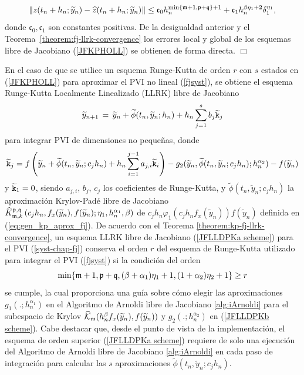 \begin{equation*}
    \left\lVert z(t_n+h_n;\widetilde{y}_n)-\widehat{z}(t_n+h_n;\widetilde{y}_n) \right\rVert \leq \mathfrak{c}_0 h_n^{\min\{\mathfrak{m}+1,\mathfrak{p}+\mathfrak{q} \}+1} + \mathfrak{c}_1h_n^{\beta\eta_1+2}\delta_1^{\eta_1},
\end{equation*}
donde $\mathfrak{c}_0,\mathfrak{c}_1$ son constantes positivas. De la desigualdad anterior y el Teorema~\ref{theorem:fj-llrk-convergence} los errores local y global de los esquemas libre de Jacobiano (\ref{JFKPHOLL}) se obtienen de forma directa. $\Box$

En el caso de que se utilice un esquema Runge-Kutta de orden $r$ con $s$ estados en (\ref{JFKPHOLL}) para aproximar el PVI no lineal (\ref{fjsyst}), se obtiene el esquema Runge-Kutta Localmente Linealizado (LLRK) libre de Jacobiano
\begin{equation}  \label{JFLLDPKa scheme}
    \widetilde{y}_{n+1}\,=\,\widetilde{y}_n+\widetilde{\phi}(t_n,\widetilde{y}_n;h_n)+h_n \sum_{j=1}^{s}b_j \widetilde{\mathtt{k}}_j
\end{equation}
para integrar PVI de dimensiones no pequeñas, donde
\begin{equation} \label{JFLLDPKb scheme}
    \widetilde{\mathtt{k}}_j = f\left( \widetilde{y}_n+\widetilde{\phi}(t_n,\widetilde{y}_n;c_jh_n)+h_n \sum_{i=1}^{j-1}a_{j,i}\widetilde{\mathtt{k}}_i \right)  - g_2(\widetilde{y}_n,\widetilde{\phi}(t_n,\widetilde{y}_n;c_jh_n);h^{\alpha_2}_n) - f( \widetilde{y}_n)
\end{equation}
y $\widetilde{\mathtt{k}}_1=0$, siendo $a_{j,i}$, $b_j$, $c_j$ los coeficientes de Runge-Kutta, y $\widetilde{\phi}(t_n,\widetilde{ y}_n;c_jh_n)$ la aproximación Krylov-Padé libre de Jacobiano $\widehat{K}_{\mathfrak{m},k}^{\mathfrak{p},\mathfrak{q}}\left(c_jh_n, f_x(\widetilde{y}_n) , f(\widetilde{y}_n) ; \eta_1, h_n^{\alpha_1}, \beta \right)$ de $c_jh_n\varphi_1(c_jh_nf_x(\widetilde {y}_n))f(\widetilde{y}_n)$ definida en (\ref{eq:gen_kp_aprox_fj}). De acuerdo con el Teorema \ref{theorem:kp-fj-llrk-convergence}, un esquema LLRK libre de Jacobiano (\ref{JFLLDPKa scheme}) para el PVI (\ref{syst-chap-fj}) conserva el orden $r$ del esquema de Runge-Kutta utilizado para integrar el PVI (\ref{fjsyst}) si la condición del orden
\begin{equation}\label{order condition}
    \min\{\mathfrak{m}+1,\mathfrak{p}+\mathfrak{q},(\beta+\alpha_1)\eta_1+1,(1+\alpha_2)\eta_2+1\} \geq r
\end{equation}
se cumple, la cual proporciona una guía sobre cómo elegir las aproximaciones $g_1(.;h^{\alpha_1}_n)$ en el Algoritmo de Arnoldi libre de Jacobiano \ref{alg:iArnoldi} para el subespacio de Krylov
$\widehat{\mathcal{K}}_{\mathfrak{m}}(h^\beta_n f_x(\widetilde{y}_n),f(\widetilde{y}_n))$ y $g_2(.;h^{\alpha_2}_n)$ en (\ref{JFLLDPKb scheme}). Cabe destacar que, desde el punto de vista de la implementación, el esquema de orden superior (\ref{JFLLDPKa scheme}) requiere de solo una ejecución del Algoritmo de Arnoldi libre de Jacobiano \ref{alg:iArnoldi} en cada paso de integración para calcular las $s$ aproximaciones $ \widetilde{\phi}(t_n,\widetilde{y}_n;c_jh_n)$.

